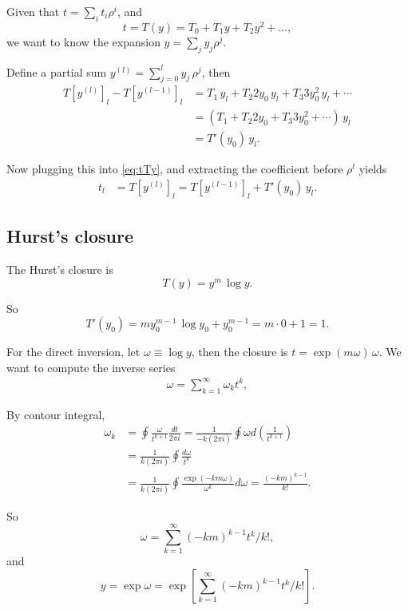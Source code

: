 \documentclass[preprint]{revtex4-1}
\numberwithin{equation}{subsection}
\numberwithin{table}{section}
\begin{document}
Given that $t = \sum_i t_i \rho^i$, and
\begin{equation}
  t = T(y) = T_0 + T_1 y + T_2 y^2 + \dots,
  \label{eq:tTy}
\end{equation}
we want to know the expansion $y = \sum_j y_j \rho^j$.


Define a partial sum $y^{(l)} = \sum_{j=0}^l y_j \, \rho^j$,
then
\begin{align*}
  T\left[ y^{(l)} \right]_l
- T\left[ y^{(l-1)} \right]_l
&=
  T_1 \, y_l
+ T_2 2 y_0 \, y_l
+ T_3 3 y_0^2 \, y_l
+ \cdots
\\
&=
  (T_1
+ T_2 2 y_0
+ T_3 3 y_0^2
+ \cdots) \, y_l
\\
&= T'(y_0) \, y_l.
\end{align*}

Now plugging this into \eqref{eq:tTy},
and extracting the coefficient before $\rho^l$
yields
\begin{align*}
  t_l
&=
  T\left[ y^{(l)} \right]_l
=
  T\left[ y^{(l-1)} \right]_l + T'(y_0) \, y_l.
\end{align*}



\subsection{Hurst's closure}

The Hurst's closure is
\[
  T(y) = y^m \, \log y.
\]

So
\[
  T'(y_0)
  = m y_0^{m -1} \, \log y_0 + y_0^{m - 1}
  = m \cdot 0 + 1 = 1.
\]

For the direct inversion,
let $\omega \equiv \log y$,
then the closure is $t = \exp(m \omega) \, \omega$.
%
We want to compute the inverse series
\begin{align*}
  \omega = \sum_{k=1}^\infty \omega_k t^k,
\end{align*}

By contour integral,
\begin{align*}
\omega_k
&=
\oint \frac{\omega}{t^{k+1}} \frac{dt}{2\pi i}
=
\frac{1}{-k (2\pi i)} \oint \omega d\left(\frac{1}{t^{k+1}}\right)
\\
&=
\frac{1}{k (2\pi i)} \oint \frac{ d\omega }{t^{k}}
\\
&=
\frac{1}{k (2\pi i)} \oint \frac{ \exp( -k m\omega)  }{\omega^{k}} d\omega
=
\frac{ (-k m)^{k-1} }
     { k! }.
\end{align*}

So
\[
  \omega = \sum_{k=1}^\infty (-k m)^{k-1} t^k / k!,
\]
and
\[
  y
= \exp \omega
= \exp\left[ \sum_{k=1}^\infty (-k m)^{k-1} t^k / k! \right].
\]
\end{document}
